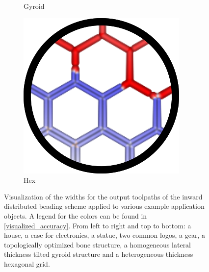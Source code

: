 \begin{figure}
\begin{subfigure}{\figwidth}
\caption{Gyroid}\label{applications_gyroid}
\end{subfigure}
\begin{subfigure}{\figwidth}\centering
\includegraphics[height=\figheight]{sources/applications/hex_grid.png}
\caption{Hex}\label{applications_hex}
\end{subfigure}
\caption{
Visualization of the widths for the output toolpaths of the inward distributed beading scheme applied to various example application objects.
A legend for the colors can be found in \cref{visualized_accuracy}.
From left to right and top to bottom: a house, a case for electronics, a statue, two common logos, a gear, a topologically optimized bone structure, a homogeneous lateral thickness tilted gyroid structure and a heterogeneous thickness hexagonal grid.
}
\label{applications_overview}
\end{figure}




